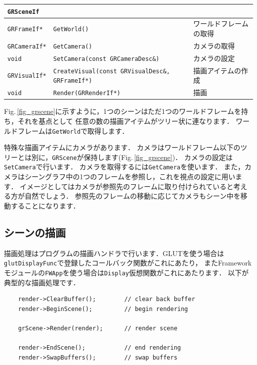 \begin{center}
\begin{tabular}{p{.15\hsize}p{.45\hsize}p{.3\hsize}}
\texttt{GRSceneIf}	 &															&	\\ \midrule
\texttt{GRFrameIf*}	 & \texttt{GetWorld()}										& ワールドフレームの取得	\\
\texttt{GRCameraIf*} & \texttt{GetCamera()}										& カメラの取得	\\
\texttt{void}		 & \texttt{SetCamera(const GRCameraDesc\&)}					& カメラの設定	\\
\texttt{GRVisualIf*} & \texttt{CreateVisual(const GRVisualDesc\&, GRFrameIf*)}	& 描画アイテムの作成	\\
\texttt{void}		 & \texttt{Render(GRRenderIf*)}								& 描画	\\
\end{tabular}
\end{center}

\KLUDGE %
\KLUDGE %

Fig.\,\ref{fig_grscene}に示すように，1つのシーンはただ1つのワールドフレームを持ち，それを基点として
\KLUDGE 任意の数の描画アイテムがツリー状に連なります．
\KLUDGE ワールドフレームは\texttt{GetWorld}で取得します．

\KLUDGE 特殊な描画アイテムにカメラがあります．
\KLUDGE カメラはワールドフレーム以下のツリーとは別に，\texttt{GRScene}が保持します(Fig.\,\ref{fig_grscene})．
\KLUDGE カメラの設定は\texttt{SetCamera}で行います．
\KLUDGE カメラを取得するには\texttt{GetCamera}を使います．
\KLUDGE また，カメラはシーングラフ中の1つのフレームを参照し，これを視点の設定に用います．
\KLUDGE イメージとしてはカメラが参照先のフレームに取り付けられていると考える方が自然でしょう．
\KLUDGE 参照先のフレームの移動に応じてカメラもシーン中を移動することになります．


\subsection*{シーンの描画}

\KLUDGE 描画処理はプログラムの描画ハンドラで行います．GLUTを使う場合は\texttt{glutDisplayFunc}で登録したコールバック関数がこれにあたり，
\KLUDGE またFrameworkモジュールの\texttt{FWApp}を使う場合は\texttt{Display}仮想関数がこれにあたります．
\KLUDGE 以下が典型的な描画処理です．
\begin{verbatim}
    render->ClearBuffer();        // clear back buffer
    render->BeginScene();         // begin rendering

    grScene->Render(render);      // render scene

    render->EndScene();           // end rendering
    render->SwapBuffers();        // swap buffers
\end{verbatim}

